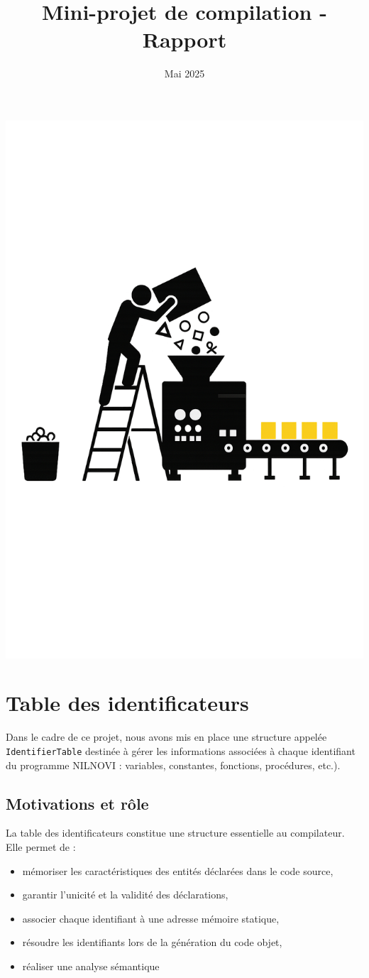 \documentclass[a4paper, 12pt]{article}
\title{Mini-projet de compilation - Rapport}
\author{
    \Names
}
\date{Mai 2025}
\begin{document}
    \maketitle

    \begin{center}
        \includegraphics[width=0.5\linewidth]{pics/illustration.png}
    \end{center}

    \newpage

    \tableofcontents
    \lstlistoflistings

    \newpage

    \section{Table des identificateurs}

    Dans le cadre de ce projet, nous avons mis en place une structure appelée \texttt{IdentifierTable} destinée à gérer les informations associées à chaque identifiant du programme NILNOVI : variables, constantes, fonctions, procédures, etc.).

    \subsection{Motivations et rôle}
    La table des identificateurs constitue une structure essentielle au compilateur. Elle permet de : 
    \begin{itemize}
        \item mémoriser les caractéristiques des entités déclarées dans le code source, 
        \item garantir l'unicité et la validité des déclarations,
        \item associer chaque identifiant à une adresse mémoire statique, 
        \item résoudre les identifiants lors de la génération du code objet,
        \item réaliser une analyse sémantique
    \end{itemize}
\end{document}
